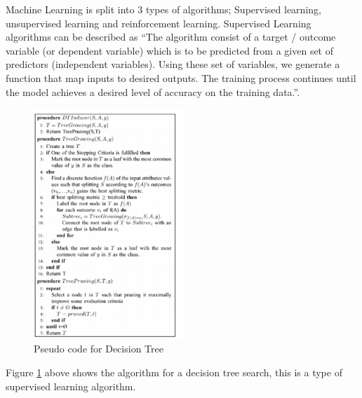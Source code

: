 \documentclass[10pt,a4paper]{scrartcl}
\begin{document}
		Machine Learning is split into 3 types of algorithms; Supervised learning, unsupervised learning and reinforcement learning. Supervised Learning algorithms can be described as ``The algorithm consist of a target / outcome variable (or dependent variable) which is to be predicted from a given set of predictors (independent variables). Using these set of variables, we generate a function that map inputs to desired outputs. The training process continues until the model achieves a desired level of accuracy on the training data.''\cite{EssentialMachineLearningAlgorithms}.
\begin{figure}[H]
	\begin{center}
	\includegraphics[width=0.5\textwidth] {pseudocodeDecisionTree.png}
	\caption{Pseudo code for Decision Tree \cite{MachineLearningAlgorithmsReview}}
	\label{DecisionTreePseudoCode}
	\end{center}
\end{figure}
Figure \ref{DecisionTreePseudoCode}	above shows the algorithm for a decision tree search, this is a type of supervised learning algorithm.	
\end{document}
